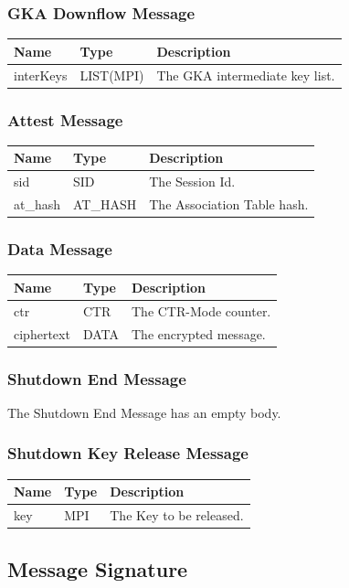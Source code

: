 \documentclass[12pt,titlepage,a4paper]{article}
\begin{document}
\subsubsection{GKA Downflow Message}
\begin{tabular}{l l l}
Name        & Type      & Description \\
\hline
interKeys   & LIST(MPI) & The GKA intermediate key list. \\
\end{tabular}

\subsubsection{Attest Message}
\begin{tabular}{l l l}
Name        & Type      & Description \\
\hline
sid         & SID       & The Session Id. \\
at\_hash     & AT\_HASH  & The Association Table hash. \\
\end{tabular}

\subsubsection{Data Message}
\begin{tabular}{l l l}
Name        & Type      & Description \\
\hline
ctr         & CTR       & The CTR-Mode counter. \\
ciphertext  & DATA      & The encrypted message. \\
\end{tabular}

\subsubsection{Shutdown End Message}
The Shutdown End Message has an empty body.

\subsubsection{Shutdown Key Release Message}
\begin{tabular}{l l l}
Name        & Type      & Description \\
\hline
key         & MPI       & The Key to be released. \\
\end{tabular}

\subsection{Message Signature}




\end{document}
